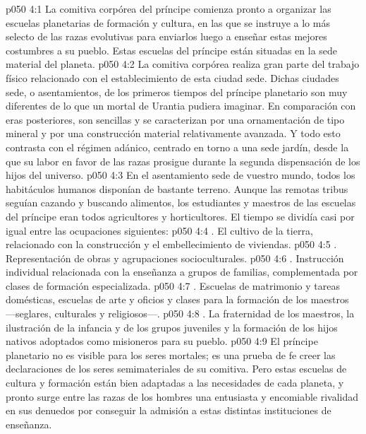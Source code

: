 \vs p050 4:1 La comitiva corpórea del príncipe comienza pronto a organizar las escuelas planetarias de formación y cultura, en las que se instruye a lo más selecto de las razas evolutivas para enviarlos luego a enseñar estas mejores costumbres a su pueblo. Estas escuelas del príncipe están situadas en la sede material del planeta.
\vs p050 4:2 La comitiva corpórea realiza gran parte del trabajo físico relacionado con el establecimiento de esta ciudad sede. Dichas ciudades sede, o asentamientos, de los primeros tiempos del príncipe planetario son muy diferentes de lo que un mortal de Urantia pudiera imaginar. En comparación con eras posteriores, son sencillas y se caracterizan por una ornamentación de tipo mineral y por una construcción material relativamente avanzada. Y todo esto contrasta con el régimen adánico, centrado en torno a una sede jardín, desde la que su labor en favor de las razas prosigue durante la segunda dispensación de los hijos del universo.
\vs p050 4:3 \pc En el asentamiento sede de vuestro mundo, todos los habitáculos humanos disponían de bastante terreno. Aunque las remotas tribus seguían cazando y buscando alimentos, los estudiantes y maestros de las escuelas del príncipe eran todos agricultores y horticultores. El tiempo se dividía casi por igual entre las ocupaciones siguientes:
\vs p050 4:4 . El cultivo de la tierra, relacionado con la construcción y el embellecimiento de viviendas.
\vs p050 4:5 . Representación de obras y agrupaciones socioculturales.
\vs p050 4:6 . Instrucción individual relacionada con la enseñanza a grupos de familias, complementada por clases de formación especializada.
\vs p050 4:7 . Escuelas de matrimonio y tareas domésticas, escuelas de arte y oficios y clases para la formación de los maestros ---seglares, culturales y religiosos---.
\vs p050 4:8 . La fraternidad de los maestros, la ilustración de la infancia y de los grupos juveniles y la formación de los hijos nativos adoptados como misioneros para su pueblo.
\vs p050 4:9 \pc El príncipe planetario no es visible para los seres mortales; es una prueba de fe creer las declaraciones de los seres semimateriales de su comitiva. Pero estas escuelas de cultura y formación están bien adaptadas a las necesidades de cada planeta, y pronto surge entre las razas de los hombres una entusiasta y encomiable rivalidad en sus denuedos por conseguir la admisión a estas distintas instituciones de enseñanza.
